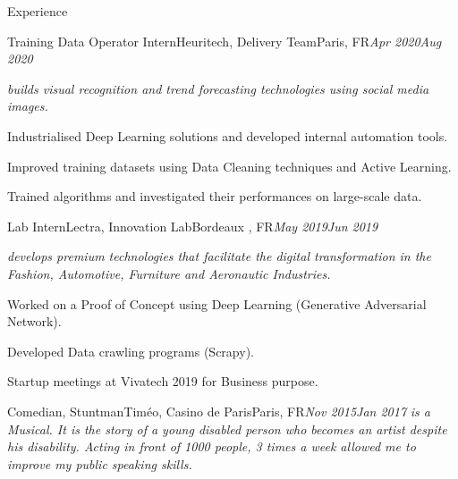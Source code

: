 \documentclass{resume}
\begin{document}
	\begin{rSection}{Experience}
		\begin{job}{Training Data Operator Intern}{Heuritech, Delivery Team}{Paris, FR}{\em Apr 2020}{\em Aug 2020}{
			\textit{\small{builds visual recognition and trend forecasting technologies using social media images.}}
			\begin{itemize}
			\small{
  				\item Industrialised Deep Learning solutions and developed internal automation tools.
				\item Improved training datasets using Data Cleaning techniques and Active Learning.
				\item Trained algorithms and investigated their performances on large-scale data.
				}
			\end{itemize}
		}
		\end{job}
		\begin{job}{Lab Intern}{Lectra, Innovation Lab}{Bordeaux , FR}{\em May 2019}{\em Jun 2019}{
			\textit{\small{develops  premium technologies that facilitate the digital transformation in the Fashion, Automotive, Furniture and Aeronautic Industries.}}
			\begin{itemize}
			\small{
				  	\item Worked on a Proof of Concept using Deep Learning (Generative Adversarial Network).
					\item Developed Data crawling programs (Scrapy).
					\item Startup meetings at Vivatech 2019 for Business purpose.
				}
			\end{itemize}
		}
		\end{job}

		\begin{job}{Comedian, Stuntman}{Timéo, Casino de Paris}{Paris, FR}{\em Nov 2015}{\em Jan 2017}{
			\textit{\small{ is a Musical. It is the story of a young disabled person who becomes an artist despite his disability. Acting in front of 1000 people, 3 times a week allowed me to improve my public speaking skills. }}
		}
		\end{job}
	\end{rSection}
	
\end{document}
